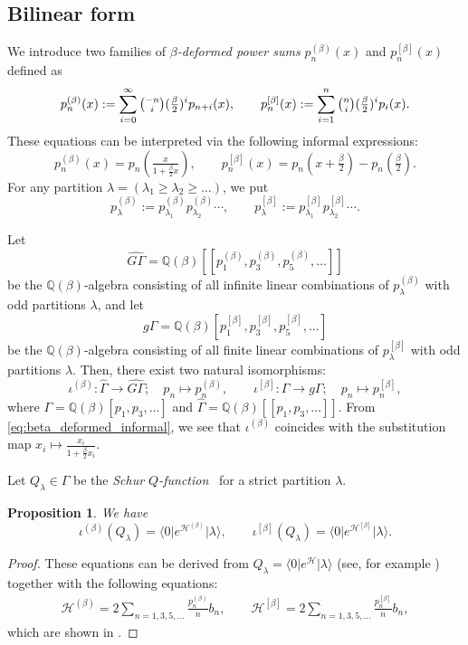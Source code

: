\documentclass{amsart}
\newtheorem{prop}[thm]{Proposition}
\def\QQ{\mathord{\mathbb{Q}}}
\def\ket#1{\vert #1 \rangle}
\def\bra#1{\langle #1 \vert}
\begin{document}
\subsection{Bilinear form}\label{sec:beta_def_powersum}


We introduce two families of \textit{$\beta$-deformed power sums}
$p^{(\beta)}_n(x)$ and $p^{[\beta]}_n(x)$ defined as
\[
p^{(\beta)}_n(x):=
\sum_{i=0}^\infty \tbinom{-n}{i}(\tfrac{\beta}{2})^ip_{n+i}(x),\qquad
p^{[\beta]}_n(x):=\sum_{i=1}^n\tbinom{n}{i}(\tfrac{\beta}{2})^ip_i(x).
\]
These equations can be interpreted via the following informal expressions:
\begin{equation}\label{eq:beta_deformed_informal}
p^{(\beta)}_n(x)=p_n(\tfrac{x}{1+\frac{\beta}{2}x}),\qquad
p^{[\beta]}_n(x)=p_n(x+\tfrac{\beta}{2})-p_n(\tfrac{\beta}{2}).
\end{equation}
For any partition $\lambda=(\lambda_1\geq \lambda_2\geq\dots )$, we put
\[
p^{(\beta)}_{\lambda}:=
p^{(\beta)}_{\lambda_1}p^{(\beta)}_{\lambda_2}\cdots,\qquad p^{[\beta]}_{\lambda}:=
p^{[\beta]}_{\lambda_1}p^{[\beta]}_{\lambda_2}\cdots
.
\]

Let  
\[
\widehat{G\Gamma}=\QQ(\beta)[[p_1^{(\beta)},p_3^{(\beta)},p_5^{(\beta)},\dots]]
\] 
be the $\QQ(\beta)$-algebra consisting of all infinite linear combinations of $p_\lambda^{(\beta)}$ with odd partitions $\lambda$, and let 
\[
g\Gamma=\QQ(\beta)[p_1^{[\beta]},p_3^{[\beta]},p_5^{[\beta]},\dots]
\] 
be the $\QQ(\beta)$-algebra consisting of all finite linear combinations of $p_\lambda^{[\beta]}$ with odd partitions $\lambda$.
Then, there exist two natural isomorphisms:
\[
\iota^{(\beta)}:\widehat{\Gamma}\to \widehat{G\Gamma};\quad
p_n\mapsto p_n^{(\beta)},\qquad
\iota^{[\beta]}:\Gamma\to g\Gamma;\quad
p_n\mapsto p_n^{[\beta]},
\]
where $\Gamma=\QQ(\beta)[p_1,p_3,\dots]$ and 
$\widehat{\Gamma}=\QQ(\beta)[[p_1,p_3,\dots]]$.
From \eqref{eq:beta_deformed_informal}, we see that $\iota^{(\beta)}$ coincides with the substitution map $x_i\mapsto \frac{x_i}{1+\frac{\beta}{2}x_i}$.

Let $Q_\lambda\in \Gamma$ be the \textit{Schur $Q$-function}~\cite[\S III.8]{macdonald1998symmetric} for a strict partition $\lambda$. 
\begin{prop}
We have
\begin{equation}\label{eq:beta_deformed_Q}
\iota^{(\beta)}(Q_\lambda)=
\bra{0}e^{\mathcal{H}^{(\beta)}}\ket{\lambda},\qquad
\iota^{[\beta]} (Q_\lambda)=\bra{0}e^{\mathcal{H}^{[\beta]}}\ket{\lambda}.
\end{equation}
\end{prop}
\begin{proof}
These equations can be derived from $Q_\lambda=\bra{0}e^{\mathcal{H}}\ket{\lambda}$ (see, for example \cite[\S 3]{baker1995symmetric}) together with the following equations:
\begin{align}
\mathcal{H}^{(\beta)}=2\sum_{n=1,3,5,\dots}\frac{p^{(\beta)}_n}{n}b_n,\qquad
\mathcal{H}^{[\beta]}=2\sum_{n=1,3,5,\dots}\frac{p^{[\beta]}_n}{n}b_n,
\end{align}
which are shown in \cite[Lemma 7]{iwao2021neutralfermionic}.
\end{proof}
\end{document}

